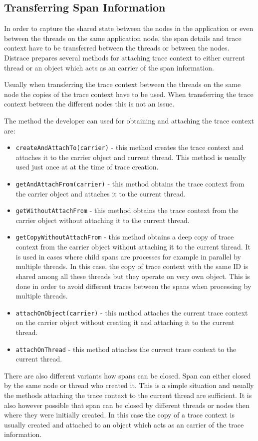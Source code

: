 \subsection{Transferring Span Information}
In order to capture the shared state between the nodes in the application or even between the threads on the same application node, the span details and trace context have to be transferred between the threads or between the nodes. Distrace prepares several methods for attaching trace context to either current thread or an object which acts as an carrier of the span information.

Usually when transferring the trace context between the threads on the same node the copies of the trace context have to be used. When transferring the trace context between the different nodes this is not an issue.

The method the developer can used for obtaining and attaching the trace context are:
\begin{itemize}
	\item \texttt{createAndAttachTo(carrier)} - this method creates the trace context and attaches it to the carrier object and current thread. This method is usually used just once at at the time of trace creation.
	\item \texttt{getAndAttachFrom(carrier)} - this method obtains the trace context from the carrier object and attaches it to the current thread. 
	\item \texttt{getWithoutAttachFrom} - this method obtains the trace context from the carrier object without attaching it to the current thread.
	\item \texttt{getCopyWithoutAttachFrom} - this method obtains a deep copy of trace context from the carrier object without attaching it to the current thread. It is used in cases where child spans are processes for example in parallel by multiple threads. In this case, the copy of trace context with the same ID is shared among all these threads but they operate on very own object. This is done in order to avoid different traces between the spans when processing by multiple threads.
	\item \texttt{attachOnObject(carrier)} - this method attaches the current trace context on the carrier object without creating it and attaching it to the current thread.
	\item \texttt{attachOnThread} - this method attaches the current trace context to the current thread.
\end{itemize}
There are also different variants how spans can be closed. Span can either closed by the same node or thread who created it. This is a simple situation and usually the methods attaching the trace context to the current thread are sufficient. It is also however possible that span can be closed by different threads or nodes then where they were initially created. In this case the copy of a trace context is usually created and attached to an object which acts as an carrier of the trace information.
